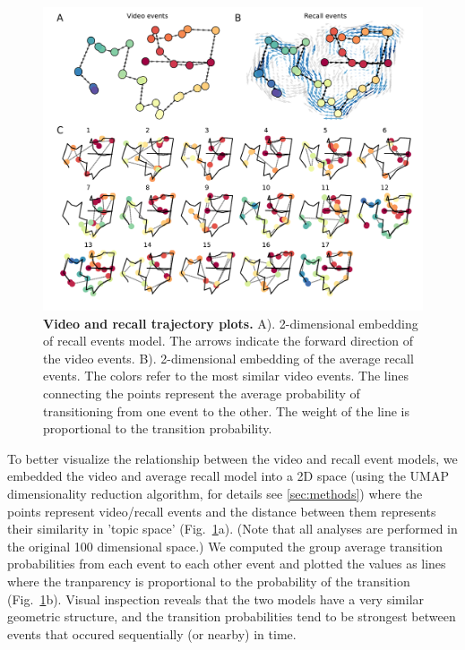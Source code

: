 \documentclass{article}
\begin{document}
{\begin{figure}[t!]
\centering
\includegraphics[width=1\textwidth]{figs/4_trajectory.pdf}
\caption{\small \textbf{Video and recall trajectory plots.} A). 2-dimensional embedding of recall events model. The arrows indicate the forward direction of the video events. B). 2-dimensional embedding of the average recall events.  The colors refer to the most similar video events.  The lines connecting the points represent the average probability of transitioning from one event to the other. The weight of the line is proportional to the transition probability.}
\label{fig:trajectory}
\end{figure}

To better visualize the relationship between the video and recall event models, we embedded the video and average recall model into a 2D space (using the UMAP dimensionality reduction algorithm, for details see \ref{sec:methods}) where the points represent video/recall events and the distance between them represents their similarity in 'topic space' (Fig.~\ref{fig:trajectory}a). (Note that all analyses are performed in the original 100 dimensional space.) We computed the group average transition probabilities from each event to each other event and plotted the values as lines where the tranparency is proportional to the probability of the transition (Fig.~\ref{fig:trajectory}b).  Visual inspection reveals that the two models have a very similar geometric structure, and the transition probabilities tend to be strongest between events that occured sequentially (or nearby) in time.

}
\end{document}
